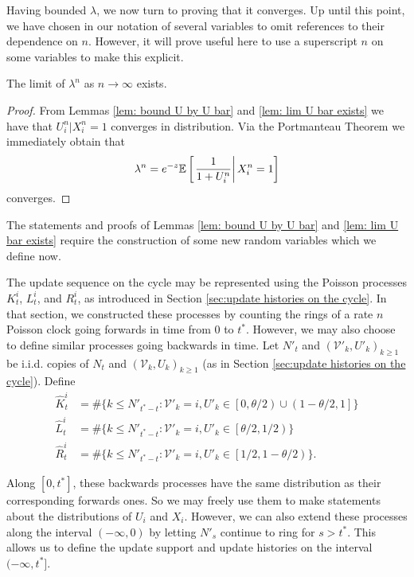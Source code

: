 	Having bounded $\lambda$, we now turn to proving that it converges.
	Up until this point, we have chosen in our notation of several variables to omit references to their dependence on $n$. However, it will prove useful here to use a superscript $n$ on some variables to make this explicit. 

	\begin{lemma}
		The limit of $\lambda^n$ as $n \rightarrow \infty$ exists.
	\end{lemma}
	\begin{proof}
		From Lemmas \ref{lem: bound U by U bar} and \ref{lem: lim U bar exists}
		we have that $U_i^n | X_i^n = 1$ converges in distribution. Via the Portmanteau Theorem \cite[Theorem 25.8]{Billingsley1995-en} we immediately obtain that
		\begin{equation}
			\lambda^n = e^{-z} \mathbb{E} \left[\left.\frac{1}{1 + U_i^n}\right| X_i^n = 1\right]
		\end{equation}
		converges. 
	\end{proof}

	The statements and proofs of Lemmas \ref{lem: bound U by U bar} and \ref{lem: lim U bar exists} require the construction of some new random variables which we define now.

	The update sequence on the cycle may be represented using the Poisson processes $K_t^i$, $L_t^i$, and $R_t^i$, as introduced in Section \ref{sec:update histories on the cycle}. In that section, we constructed these processes by counting the rings of a rate $n$ Poisson clock going forwards in time from $0$ to $t^*$. However, we may also choose to define similar processes going backwards in time. Let $N'_t$ and $(\mathcal{V}'_k, U'_k)_{k \geq 1}$ be i.i.d. copies of $N_t$ and $(\mathcal{V}_k, U_k)_{k \geq 1}$ (as in Section \ref{sec:update histories on the cycle}). Define
	\begin{align}
		\hat{K}^i_t &= \#\{k \leq N'_{t^*-t}: \mathcal{V}'_k = i, U'_k \in \left[0, \theta/2\right) \cup \left(1 - \theta/2, 1\right]\}\\
		\hat{L}^i_t &= \#\{k \leq N'_{t^*-t}: \mathcal{V}'_k = i, U'_k \in \left[\theta/2, 1/2\right)\}\\
		\hat{R}^i_t &= \#\{k \leq N'_{t^*-t}: \mathcal{V}'_k = i, U'_k \in \left[1/2, 1 - \theta/2\right)\}.
	\end{align}

	Along $[0, t^*]$, these backwards processes have the same distribution as their corresponding forwards ones. So we may freely use them to make statements about the distributions of $U_i$ and $X_i$. However, we can also extend these processes along the interval $(-\infty, 0)$ by letting $N'_s$ continue to ring for $s > t^*$. This allows us to define the update support and update histories on the interval $(-\infty, t^*]$.

